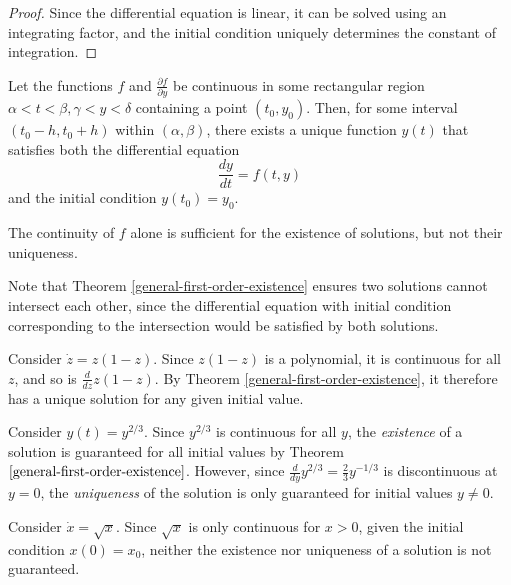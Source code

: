 \documentclass[12pt]{article}
\begin{document}
\begin{proof}
    Since the differential equation is linear, it can be solved using an integrating factor, and the initial condition uniquely determines the constant of integration.
\end{proof}

\begin{thm}\label{general-first-order-existence}
    Let the functions $f$ and $\frac{\partial{f}}{\partial{y}}$ be continuous in some rectangular region $\alpha < t < \beta, \gamma < y < \delta$ containing a point $(t_0, y_0)$. Then, for some interval $(t_0 - h, t_0 + h)$ within $(\alpha, \beta)$, there exists a unique function $y(t)$ that satisfies both the differential equation
    \[\frac{dy}{dt} = f(t, y)\] and the initial condition $y(t_0) = y_0$.
\end{thm}

\begin{cor}
    The continuity of $f$ alone is sufficient for the existence of solutions, but not their uniqueness.
\end{cor}

\begin{rmk}
    Note that Theorem \ref{general-first-order-existence} ensures two solutions cannot intersect each other, since the differential equation with initial condition corresponding to the intersection would be satisfied by both solutions.
\end{rmk}

\begin{exmp}
    Consider $\dot{z} = z(1-z)$. Since $z(1-z)$ is a polynomial, it is continuous for all $z$, and so is $\frac{d}{dz}z(1-z)$. By Theorem \ref{general-first-order-existence}, it therefore has a unique solution for any given initial value.
\end{exmp}

\begin{exmp}
    Consider $y(t) = y^{2/3}$. Since $y^{2/3}$ is continuous for all $y$, the \emph{existence} of a solution is guaranteed for all initial values by Theorem $\ref{general-first-order-existence}$. However, since $\frac{d}{dy}y^{2/3} = \frac{2}{3}y^{-1/3}$ is discontinuous at $y = 0$, the \emph{uniqueness} of the solution is only guaranteed for initial values $y \neq 0$.
\end{exmp}

\begin{exmp}
    Consider $\dot{x} = \sqrt{x}$. Since $\sqrt{x}$ is only continuous for $x > 0$, given the initial condition $x(0) = x_0$, neither the existence nor uniqueness of a solution is not guaranteed.
\end{exmp}
\end{document}
